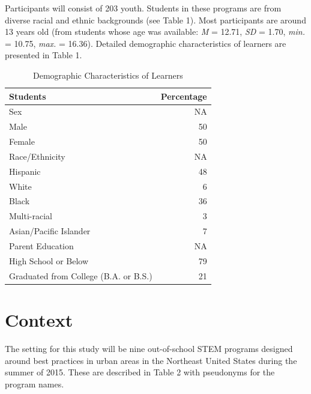 \documentclass[]{msu-thesis}
\theoremstyle{definition}
\theoremstyle{definition}
\theoremstyle{definition}
\theoremstyle{remark}
\begin{document}
Participants will consist of 203 youth. Students in these programs are
from diverse racial and ethnic backgrounds (see Table 1). Most
participants are around 13 years old (from students whose age was
available: \emph{M} = 12.71, \emph{SD} = 1.70, \emph{min.} = 10.75,
\emph{max.} = 16.36). Detailed demographic characteristics of learners
are presented in Table 1.

\begin{table}

\caption{\label{tab:unnamed-chunk-3}Demographic Characteristics of Learners}
\centering
\begin{tabular}[t]{lr}
\toprule
Students & Percentage\\
\midrule
Sex & NA\\
Male & 50\\
Female & 50\\
Race/Ethnicity & NA\\
Hispanic & 48\\
\addlinespace
White & 6\\
Black & 36\\
Multi-racial & 3\\
Asian/Pacific Islander & 7\\
Parent Education & NA\\
\addlinespace
High School or Below & 79\\
Graduated from College (B.A. or B.S.) & 21\\
\bottomrule
\end{tabular}
\end{table}

\section{Context}\label{context}

The setting for this study will be nine out-of-school STEM programs
designed around best practices in urban areas in the Northeast United
States during the summer of 2015. These are described in Table 2 with
pseudonyms for the program names.
\end{document}
